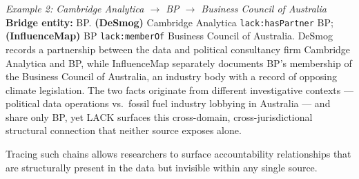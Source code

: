 \begin{sloppypar}
\textit{Example 2: Cambridge Analytica $\rightarrow$ BP $\rightarrow$ Business Council of Australia}
\noindent\textbf{Bridge entity:} BP. \textbf{(DeSmog)} Cambridge Analytica \texttt{lack:hasPartner} BP; \textbf{(InfluenceMap)} BP \texttt{lack:memberOf} Business Council of Australia.
DeSmog records a partnership between the data and political consultancy firm Cambridge Analytica and BP, while InfluenceMap separately documents BP's membership of the Business Council of Australia, an industry body with a record of opposing climate legislation.
The two facts originate from different investigative contexts --- political data operations vs.\ fossil fuel industry lobbying in Australia --- and share only BP, yet LACK surfaces this cross-domain, cross-jurisdictional structural connection that neither source exposes alone.
\end{sloppypar}

Tracing such chains allows researchers to surface accountability relationships that are structurally present in the data but invisible within any single source.



